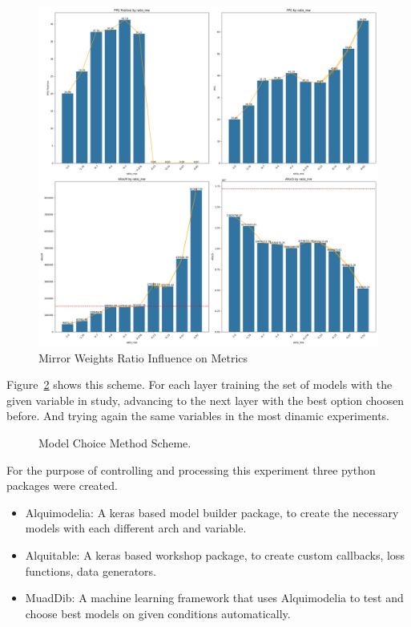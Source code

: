 \begin{figure}[H]
    \centering
    \includegraphics[width=\textwidth]{plots/article_ratio_mw.png}
    \caption{Mirror Weights Ratio Influence on Metrics}
    \label{fig:Ratio_influence_on_metrics}
  \end{figure}

\textcolor[rgb]{0,0.5,0}{Figure~\ref{fig:method_training} shows this scheme. For each layer training the set of models with the given variable in study, advancing to the next layer with the best option choosen before. And trying again the same variables in the most dinamic experiments.\\}

\begin{figure}[H]
	\centering
	\resizebox{\linewidth}{!}{}
	\caption{Model Choice Method Scheme.}
	\label{fig:method_training}
\end{figure}

For the purpose of controlling and processing this experiment three python packages were created.

\begin{itemize}
    \item Alquimodelia: A keras based model builder package, to create the necessary models with each different arch and variable.
    \item Alquitable: A keras based workshop package, to create custom callbacks, loss functions, data generators.
    \item MuadDib: A machine learning framework that uses Alquimodelia to test and choose best models on given conditions automatically.
\end{itemize}

